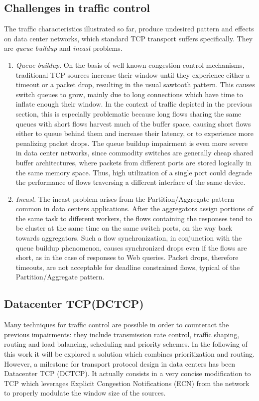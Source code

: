 \subsection{Challenges in traffic control}
The traffic characteristics illustrated so far, produce undesired pattern and effects on data center networks, which standard TCP transport suffers specifically. They are \textit{queue buildup} and \textit{incast} problems.
\begin{enumerate}
	\item \textsl{Queue buildup}. On the basis of well-known congestion control mechanisms, traditional TCP sources increase their window until they experience either a timeout or a packet drop, resulting in the usual sawtooth pattern. This causes switch queues to grow, mainly due to long connections which have time to inflate enough their window. In the context of traffic depicted in the previous section, this is especially problematic because long flows sharing the same queues with short flows harvest much of the buffer space, causing short flows either to queue behind them and increase their latency, or to experience more penalizing packet drops. The queue buildup impairment is even more severe in data center networks, since commodity switches are generally cheap shared buffer architectures, where packets from different ports are stored logically in the same memory space. Thus, high utilization of a single port could degrade the performance of flows traversing a different interface of the same device.
	\item \textsl{Incast}. The incast problem arises from the Partition/Aggregate pattern common in data centers applications. After the aggregators assign portions of the same task to different workers, the flows containing the responses tend to be cluster at the same time on the same switch ports, on the way back towards aggregators. Such a flow synchronization, in conjunction with the queue buildup phenomenon, causes synchronized drops even if the flows are short, as in the case of responses to Web queries. Packet drops, therefore timeouts, are not acceptable for deadline constrained flows, typical of the Partition/Aggregate pattern. 
\end{enumerate}
\subsection{Datacenter TCP(DCTCP)}
Many techniques for traffic control are possible in order to counteract the previous impairments: they include transmission rate control, traffic shaping, routing and load balancing, scheduling and priority schemes. In the following of this work it will be explored a solution which combines prioritization and routing. However, a milestone for transport protocol design in data centers has been Datacenter TCP (DCTCP). It actually consists in a very concise modification to TCP which leverages Explicit Congestion Notifications (ECN) from the network to properly modulate the window size of the sources. 
